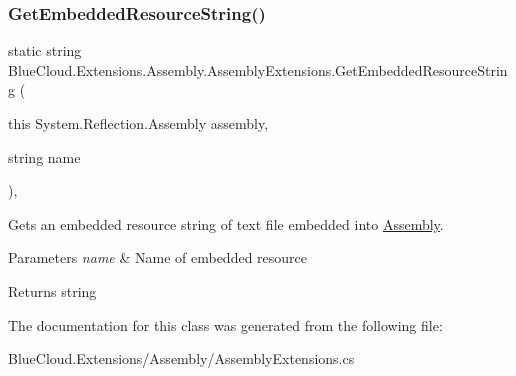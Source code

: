 \subsubsection{\texorpdfstring{Get\+Embedded\+Resource\+String()}{GetEmbeddedResourceString()}}
{\footnotesize\ttfamily static string Blue\+Cloud.\+Extensions.\+Assembly.\+Assembly\+Extensions.\+Get\+Embedded\+Resource\+String (\begin{DoxyParamCaption}\item[{this System.\+Reflection.\+Assembly}]{assembly,  }\item[{string}]{name }\end{DoxyParamCaption})\hspace{0.3cm}{\ttfamily [inline]}, {\ttfamily [static]}}



Gets an embedded resource string of text file embedded into \mbox{\hyperlink{namespace_blue_cloud_1_1_extensions_1_1_assembly}{Assembly}}. 


\begin{DoxyParams}{Parameters}
{\em name} & Name of embedded resource\\
\hline
\end{DoxyParams}
\begin{DoxyReturn}{Returns}
string
\end{DoxyReturn}


The documentation for this class was generated from the following file\+:\begin{DoxyCompactItemize}
\item 
Blue\+Cloud.\+Extensions/\+Assembly/Assembly\+Extensions.\+cs\end{DoxyCompactItemize}
